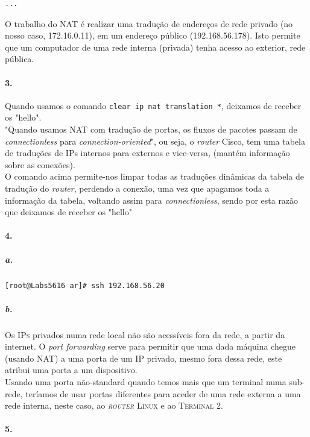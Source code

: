 \begin{verbatim}
...
\end{verbatim}

O trabalho do NAT é realizar uma tradução de endereços de rede privado (no nosso caso, \textsf{172.16.0.11}), em um endereço público (\textsf{192.168.56.178}). Isto permite  que um computador de uma rede interna (privada) tenha acesso ao exterior, rede pública.


\paragraph{3.}
Quando usamos o comando \texttt{clear ip nat translation *}, deixamos de receber os \textsf{"hello"}.\\
"Quando usamos NAT com tradução de portas, os fluxos de pacotes passam de \emph{connectionless} para \emph{connection-oriented}", ou seja, o \textsf{\emph{router} Cisco}, tem uma tabela de traduções de \textsf{IPs} internos para externos e vice-versa, (mantém informação sobre as conexões).\\
O comando acima permite-nos limpar todas as traduções dinâmicas da tabela de tradução do \emph{router}, perdendo a conexão, uma vez que apagamos toda a informação da tabela, voltando assim para \emph{connectionless}, sendo por esta razão que deixamos de receber os \textsf{"hello"}


\paragraph{4.}

\subparagraph{a.}
\begin{verbatim}
[root@Labs5616 ar]# ssh 192.168.56.20
\end{verbatim}


\subparagraph{b.}
Os \textsc{IPs} privados numa rede local não são acessíveis fora da rede, a partir da internet. O \emph{port forwarding} serve para permitir que uma dada máquina chegue (usando NAT) a uma porta de um IP privado, mesmo fora dessa rede, este atribui uma porta a um dispositivo.\\
Usando uma porta não-standard quando temos mais que um terminal numa sub-rede, teríamos de usar portas diferentes para aceder de uma rede externa a uma rede interna, neste caso, ao \textsc{\emph{router} Linux} e ao \textsc{Terminal 2}.


\paragraph{5.}

